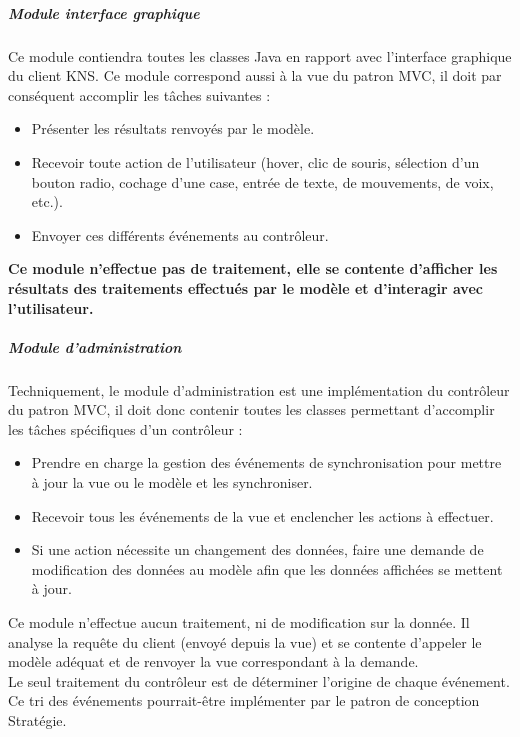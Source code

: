 \documentclass[10pt,a4paper]{report}
\begin{document}
				\subparagraph{Module interface graphique}
				\begin{flushleft}
				Ce module contiendra toutes les classes Java en rapport avec l'interface graphique du client KNS. Ce module correspond aussi à la vue du patron MVC, il doit par conséquent accomplir les tâches suivantes :\\
					
					\begin{itemize}
						\item Présenter les résultats renvoyés par le modèle.
						\item Recevoir toute action de l'utilisateur (hover, clic de souris, sélection d'un bouton radio, cochage d'une case, entrée de texte, de mouvements, de voix, etc.).
						\item Envoyer ces différents événements au contrôleur. 
					\end{itemize}
					
					\textbf{Ce module n'effectue pas de traitement, elle se contente d'afficher les résultats des traitements effectués par le modèle et d'interagir avec l'utilisateur.}\\
				\end{flushleft}
						
				\subparagraph{Module d'administration}
				
				\begin{flushleft}
				Techniquement, le module d'administration est une implémentation du contrôleur du patron MVC, il doit donc contenir toutes les classes permettant d'accomplir les tâches spécifiques d'un contrôleur :
				
				\begin{itemize}
					\item Prendre en charge la gestion des événements de synchronisation pour mettre à jour la vue ou le modèle et les synchroniser. 
					\item Recevoir tous les événements de la vue et enclencher les actions à effectuer. 
					\item Si une action nécessite un changement des données, faire une demande de modification des données au modèle afin que les données affichées se mettent à jour. 
				\end{itemize}
				
Ce module n'effectue aucun traitement, ni de modification sur la donnée. Il analyse la requête du client (envoyé depuis la vue) et se contente d'appeler le modèle adéquat et de renvoyer la vue correspondant à la demande.\\
Le seul traitement du contrôleur est de déterminer l'origine de chaque événement. Ce tri des événements pourrait-être implémenter par le patron de conception Stratégie.
				\end{flushleft}
				
\end{document}

